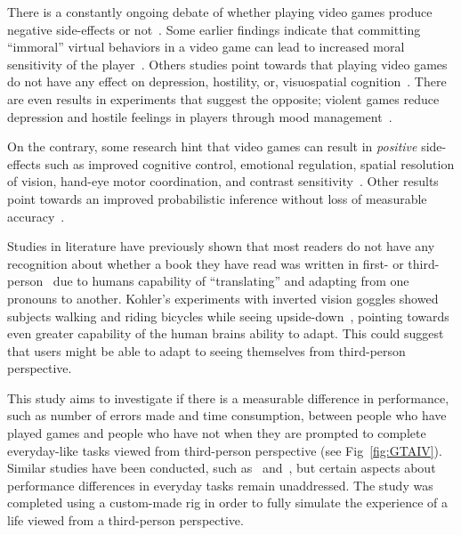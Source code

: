 \documentclass[runningheads,a4paper,oribibl]{llncs}
\begin{document}
There is a constantly ongoing debate of whether playing video games produce negative side-effects or not~\cite{tear2014video}. Some earlier findings indicate that committing ``immoral'' virtual behaviors in a video game can lead to increased moral sensitivity of the player~\cite{grizzard2014being}. Others studies point towards that playing video games do not have any effect on depression, hostility, or, visuospatial cognition~\cite{valadez2012just}. There are even results in experiments that suggest the opposite; violent games reduce depression and hostile feelings in players through mood management~\cite{ferguson2015hitman}. 

On the contrary, some research hint that video games can result in \emph{positive} side-effects such as improved cognitive control, emotional regulation, spatial resolution of vision, hand-eye motor coordination, and contrast sensitivity~\cite{gong2015enhanced}. Other results point towards an improved probabilistic inference without loss of measurable accuracy~\cite{green2010improved}.

Studies in literature have previously shown that most readers do not have any recognition about whether a book they have read was written in first- or third-person~\cite{hagg2012nya} due to humans capability of ``translating'' and adapting from one pronouns to another. Kohler's experiments with inverted vision goggles showed subjects walking and riding bicycles while seeing upside-down~\cite{kohler1962goggles}, pointing towards even greater capability of the human brains ability to adapt. This could suggest that users might be able to adapt to seeing themselves from third-person perspective.

This study aims to investigate if there is a measurable difference in performance, such as number of errors made and time consumption, between people who have played games and people who have not when they are prompted to complete everyday-like tasks viewed from third-person perspective (see Fig~\ref{fig:GTAIV}). Similar studies have been conducted, such as~\cite{schmierbach2011exploring} and~\cite{nakamura20103pi}, but certain aspects about performance differences in everyday tasks remain unaddressed. The study was completed using a custom-made rig in order to fully simulate the experience of a life viewed from a third-person perspective.
\end{document}
